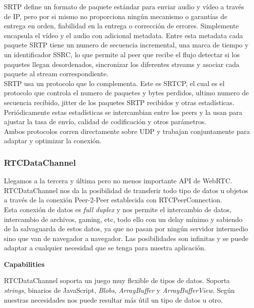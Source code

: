 SRTP define un formato de paquete estándar para enviar audio y vídeo a través de IP, pero por si mismo no proporciona ningún mecanismo o garantías de entrega en orden, fiabilidad en la entrega o corrección de errores. Simplemente encapsula el vídeo y el audio con adicional metadata. Entre esta metadata cada paquete SRTP tiene un numero de secuencia incremental, una marca de tiempo y un identificador SSRC, lo que permite al peer que recibe el flujo detectar si los paquetes llegan desordenados, sincronizar los diferentes streams y asociar cada paquete al stream correspondiente.\\

SRTP usa un protocolo que lo complementa. Este es SRTCP, el cual es el protocolo que controla el numero de paquetes y bytes perdidos, ultimo numero de secuencia recibido, jitter de los paquetes SRTP recibidos y otras estadísticas. Periódicamente estas estadísticas se intercambian entre los peers y la usan para ajustar la tasa de envío, calidad de codificación y otros parámetros.\\

Ambos protocolos corren directamente sobre UDP y trabajan conjuntamente para adaptar y optimizar la conexión.\\


\subsubsection{RTCDataChannel}

Llegamos a la tercera y última pero no menos importante API de WebRTC. RTCDataChannel nos da la posibilidad de transferir todo tipo de datos u objetos a través de la conexión Peer-2-Peer establecida con RTCPeerConnection.\\

Esta conexión de datos es \textit{full duplex} y nos permite el intercambio de datos, intercambio de archivos, gaming, etc, todo ello con un delay mínimo y sabiendo de la salvaguarda de estos datos, ya que no pasan por ningún servidor intermedio sino que van de navegador a navegador. Las posibilidades son infinitas y se puede adaptar a cualquier necesidad que se tenga para nuestra aplicación.\\

\begin{normalsize}
\noindent \textbf{Capabilities}\\
\end{normalsize}

RTCDataChannel soporta un juego muy flexible de tipos de datos. Soporta \textit{strings}, binarios de JavaScript, \textit{Blobs}, \textit{ArrayBuffer} y \textit{ArrayBufferView}. Según nuestras necesidades nos puede resultar más útil un tipo de datos u otro.\\

